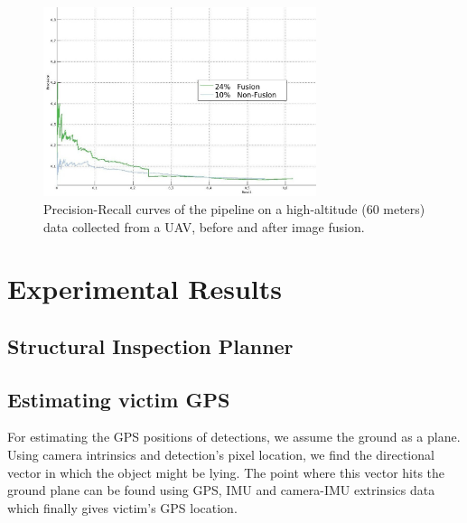 \documentclass[runningheads]{llncs}
\begin{document}
\begin{figure}
  \centering
  	\includegraphics[width=8cm]{img/fusion/Roth/PR-roth-all-detections.jpg} 

  \caption{Precision-Recall curves of the pipeline on a high-altitude (60 meters) data collected from a UAV, before and after image fusion.}\label{fig:fusion}
\end{figure}


\section{Experimental Results}

\subsection{Structural Inspection Planner}

\subsection{Estimating victim GPS}

For estimating the GPS positions of detections, we assume the ground as a plane. Using camera intrinsics and detection's pixel location, we find the directional vector in which the object might be lying. The point where this vector hits the ground plane can be found using GPS, IMU and camera-IMU extrinsics data which finally gives victim's GPS location.
\end{document}
